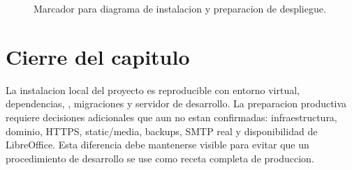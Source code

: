 \begin{figure}[H]
  \centering
  \caption{Marcador para diagrama de instalacion y preparacion de despliegue.}
  \label{fig:instalacion-flujo-configuracion}
\end{figure}

\section{Cierre del capitulo}
\label{sec:instalacion-cierre}

La instalacion local del proyecto es reproducible con entorno virtual, dependencias, , migraciones y servidor de desarrollo. La preparacion productiva requiere decisiones adicionales que aun no estan confirmadas: infraestructura, dominio, HTTPS, static/media, backups, SMTP real y disponibilidad de LibreOffice. Esta diferencia debe mantenerse visible para evitar que un procedimiento de desarrollo se use como receta completa de produccion.
